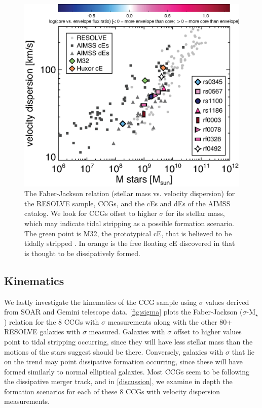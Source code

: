 \documentclass[iop,apj]{emulateapj}
\begin{document}
 \begin{figure}[b]
\begin{center}
\includegraphics{faber-jackson_resolvesigmas.eps}
\caption{The Faber-Jackson relation (stellar mass vs. velocity dispersion) for the RESOLVE sample, CCGs, and the cEs and dEs of the AIMSS catalog. We look for CCGs offset to higher $\sigma$ for its stellar mass, which may indicate tidal stripping as a possible formation scenario. The green point is M32, the prototypical cE, that is believed to be tidally stripped \citep{Faber1973}. In orange is the free floating cE discovered in \citet{Huxor2013} that is thought to be dissipatively formed.}
\label{fig:sigma}
\end{center}
\end{figure}
 
\subsection{Kinematics}
\label{kin}
 We lastly investigate the kinematics of the CCG sample using $\sigma$ values derived from SOAR and Gemini telescope data. \autoref{fig:sigma} plots the Faber-Jackson ($\sigma$-M$_{\star}$) relation for the 8 CCGs with $\sigma$ measurements along with the other 80+ RESOLVE galaxies with $\sigma$ measured. Galaxies with $\sigma$ offset to higher values point to tidal stripping occurring, since they will have less stellar mass than the motions of the stars suggest should be there. Conversely, galaxies with $\sigma$ that lie on the trend may point dissipative formation occurring, since these will have formed similarly to normal elliptical galaxies. Most CCGs seem to be following the dissipative merger track, and in \autoref{discussion}, we examine in depth the formation scenarios for each of these 8 CCGs with velocity dispersion measurements.
\end{document}
